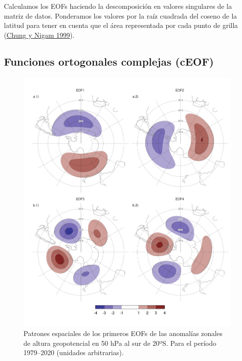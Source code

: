 \documentclass[12pt,oneside,a4paper]{reedthesis}
\begin{document}
Calculamos los EOFs haciendo la descomposición en valores singulares de la matriz de datos.
Ponderamos los valores por la raíz cuadrada del coseno de la latitud para tener en cuenta que el área representada por cada punto de grilla (\protect\hyperlink{ref-chung1999}{Chung y Nigam 1999}).

\hypertarget{ceof-metodo}{%
\subsection{Funciones ortogonales complejas (cEOF)}\label{ceof-metodo}}



\begin{figure}

{\centering \includegraphics{figures/20-ceofs/eof-naive-1} 

}

\caption{Patrones espaciales de los primeros EOFs de las anomalías zonales de altura geopotencial en 50 hPa al sur de 20ºS. Para el período 1979--2020 (unidades arbitrarias).}\label{fig:eof-naive}
\end{figure}
\end{document}
